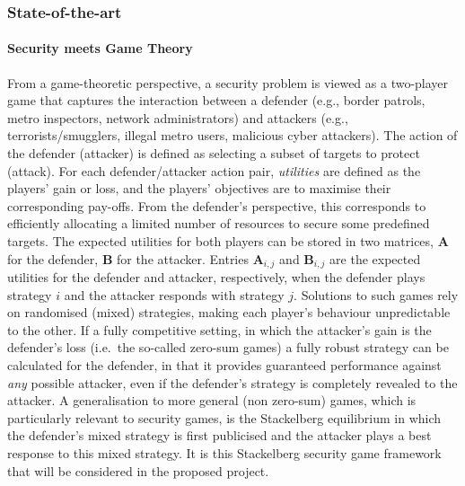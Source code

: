  

 

\subsubsection*{State-of-the-art}
\paragraph{Security meets Game Theory }
From a game-theoretic perspective, a security problem is viewed as a two-player game that captures the interaction between a defender (e.g., border patrols, metro inspectors, network administrators) and attackers (e.g., terrorists/smugglers, illegal metro users, malicious cyber attackers). The action of the defender (attacker) is defined as selecting a subset of targets to protect (attack). For each defender/attacker action pair, \textit{utilities} are defined as the players' gain or loss, and the players' objectives are to maximise their corresponding pay-offs. From the defender's perspective, this corresponds to efficiently allocating a limited number of resources to secure some predefined targets. The expected utilities for both players can be stored in two  matrices,  $\boldsymbol A$ for the defender,  $\boldsymbol B$ for the attacker. Entries $\boldsymbol A_{i,j}$ and  $\boldsymbol  B_{i,j}$  are the expected utilities for the defender and attacker, respectively, when the defender plays strategy $i$ and the attacker responds with strategy $j$.
Solutions to such games rely on randomised (mixed) strategies, making each player's behaviour unpredictable to the other.  If a fully competitive setting, in which the attacker's gain is the defender's loss (i.e.\ the so-called zero-sum games) a fully robust strategy can be calculated for the defender, in that it provides guaranteed performance against {\em any} possible attacker, even if the defender's strategy is completely revealed to the attacker.  
A generalisation to more general (non zero-sum) games, which is particularly relevant to security games, is the Stackelberg equilibrium\cite{korzhyk2011stackelberg} in which the defender's mixed strategy is first publicised and the attacker plays a best response to this mixed strategy.
It is this Stackelberg security game framework that will be considered in the proposed project.

